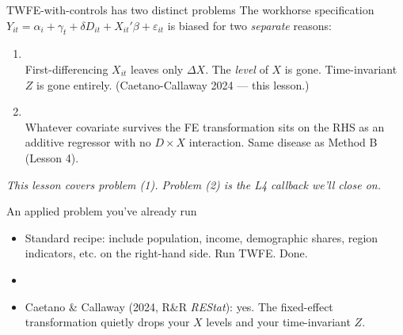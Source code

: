 \documentclass[aspectratio=169,11pt]{beamer}
\begin{document}
\begin{frame}{TWFE-with-controls has two distinct problems}
\vspace{0.4em}
The workhorse specification $Y_{it} = \alpha_i + \gamma_t + \delta D_{it} + X_{it}'\beta + \varepsilon_{it}$ is biased for two \textit{separate} reasons:
\vspace{0.5em}
\begin{enumerate}
  \item {} \\[0.2em]
  First-differencing $X_{it}$ leaves only $\Delta X$. The \textit{level} of $X$ is gone. Time-invariant $Z$ is gone entirely. \;\; (Caetano-Callaway 2024 --- this lesson.)
  \item {} \\[0.2em]
  Whatever covariate survives the FE transformation sits on the RHS as an additive regressor with no $D{\times}X$ interaction. Same disease as Method B (Lesson 4).
\end{enumerate}
\vspace{0.5em}
\begin{center}
\small\color{warmgray}\itshape
This lesson covers problem (1). Problem (2) is the L4 callback we'll close on.
\end{center}
\end{frame}

\begin{frame}{An applied problem you've already run}
\vspace{0.5em}
\vspace{0.5em}
\begin{itemize}
  \item Standard recipe: include population, income, demographic shares, region indicators, etc. on the right-hand side. Run TWFE. Done.
  \item {}
  \item Caetano \& Callaway (2024, R\&R \textit{REStat}): yes. The fixed-effect transformation quietly drops your $X$ levels and your time-invariant $Z$.
\end{itemize}
\end{frame}
\end{document}
